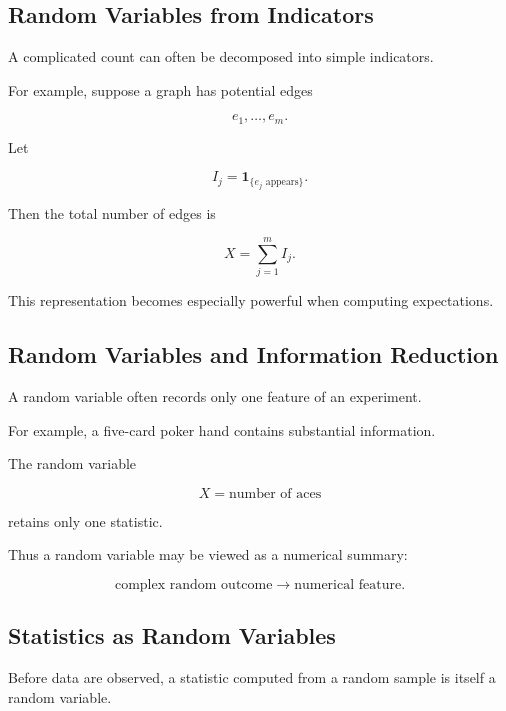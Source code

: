\subsection{Random Variables from Indicators}
\label{subsec:rv-from-indicators}

A complicated count can often be decomposed into simple indicators.

For example, suppose a graph has potential edges

\[
e_1,\ldots,e_m.
\]

Let

\[
I_j
=
\mathbf{1}_{\{e_j\text{ appears}\}}.
\]

Then the total number of edges is

\[
\boxed{
X
=
\sum_{j=1}^{m}I_j.
}
\]

This representation becomes especially powerful when computing
expectations.

\subsection{Random Variables and Information Reduction}
\label{subsec:rv-information-reduction}

A random variable often records only one feature of an experiment.

For example, a five-card poker hand contains substantial information.

The random variable

\[
X
=
\text{number of aces}
\]

retains only one statistic.

Thus a random variable may be viewed as a numerical summary:

\[
\boxed{
\text{complex random outcome}
\longrightarrow
\text{numerical feature}.
}
\]

\subsection{Statistics as Random Variables}
\label{subsec:statistics-as-random-variables}

Before data are observed, a statistic computed from a random sample is
itself a random variable.

